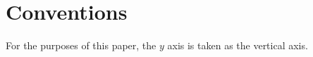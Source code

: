 \section{Conventions}

	For the purposes of this paper, the $y$ axis is taken as the vertical axis.
